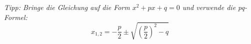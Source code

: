 \textit{Tipp: Bringe die Gleichung auf die Form $x^2 + px + q = 0$ und verwende die pq-Formel:}
\[
    x_{1,2} = -\frac{p}{2} \pm \sqrt{\left(\frac{p}{2}\right)^2 - q}
\]


